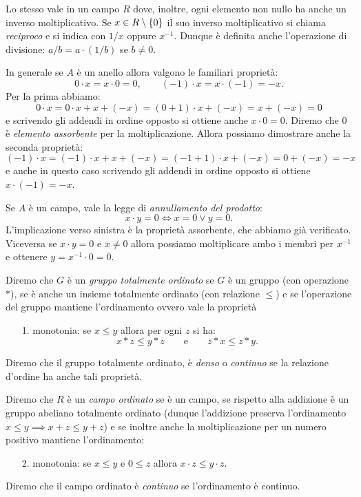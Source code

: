 Lo stesso vale in un campo $R$ dove, inoltre, ogni elemento non nullo ha 
anche un inverso moltiplicativo. Se $x\in R\setminus{\left\{ 0 \right\}}$ il suo
inverso moltiplicativo si chiama \emph{reciproco} e si indica con $1/x$ oppure $x^{-1}$.
Dunque è definita anche l'operazione di divisione: $a/b = a\cdot (1/b)$
se $b\neq 0$.

In generale se $A$ è un anello allora valgono
le familiari proprietà:
\[
  0\cdot x = x\cdot 0 = 0, \qquad
  (-1)\cdot x = x \cdot (-1) = -x.
\]
Per la prima abbiamo: 
\[
  0\cdot x = 0\cdot x + x + (-x) = (0+1)\cdot x + (-x) = x + (-x) = 0
\]
e scrivendo gli addendi in ordine opposto si ottiene anche $x\cdot 0 = 0$.
Diremo che $0$ è \emph{elemento assorbente}
%
%  
%
per la moltiplicazione.
Allora possiamo dimostrare anche la seconda proprietà:
\[
   (-1)\cdot x = (-1)\cdot x + x + (-x) = (-1 + 1)\cdot x + (-x) = 0 + (-x) = -x
\]
e anche in questo caso scrivendo gli addendi in ordine opposto si ottiene $x\cdot(-1)=-x$.

Se $A$ è un campo, vale la legge di \emph{annullamento del prodotto}:
%
%
\[
  x\cdot y = 0 \iff x=0 \lor y=0.
\]
L'implicazione verso sinistra è la proprietà assorbente, che abbiamo già 
verificato. 
Viceversa se $x\cdot y = 0$ e $x\neq 0$ allora possiamo moltiplicare
ambo i membri per $x^{-1}$ e ottenere $y=x^{-1}\cdot 0 = 0$.

\begin{definition}
  \label{def:gruppo_ordinato}%
  \label{def:campo_ordinato}%
  Diremo che $G$ è un \emph{gruppo totalmente ordinato}
%
% 
  se $G$ è un gruppo
  (con operazione $*$),
  se è anche un insieme totalmente ordinato (con relazione $\le$)
  e se l'operazione del gruppo mantiene 
  l'ordinamento ovvero vale la proprietà
  \begin{enumerate}
    \item[1.] monotonia:
    se $x\le y$ allora per ogni $z$ si ha:
      \[
      x*z \le y*z \qquad\text{e}\qquad z*x \le z*y.
      \] 
  \end{enumerate}
  Diremo che il gruppo totalmente ordinato, 
  è \emph{denso} o \emph{continuo} se la relazione 
  d'ordine ha anche tali proprietà.

  Diremo che $R$ è un \emph{campo ordinato}
%
%
  se è un campo, 
  se rispetto alla addizione 
  è un gruppo abeliano totalmente ordinato
  (dunque l'addizione preserva l'ordinamento 
  $x\le y \implies x+z\le y+z$)
  e se inoltre anche la moltiplicazione per un numero positivo 
  mantiene l'ordinamento:
  \begin{enumerate}
    \item[2.] monotonia: 
    se $x\le y$ e $0\le z$ allora $x\cdot z \le y\cdot z$. 
  \end{enumerate} 

  Diremo che il campo ordinato è \emph{continuo} 
  se l'ordinamento è continuo.
\end{definition}

